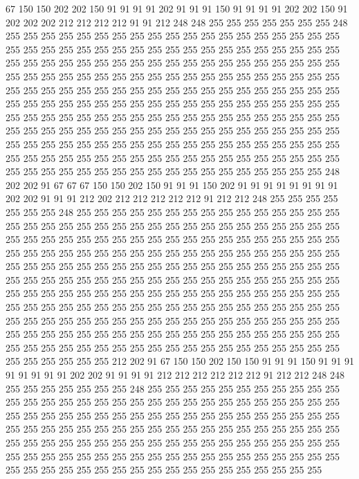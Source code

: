 67 150 150 202 202 150 91 91 91 91 202 91 91 91 150 91 91 91 91 202
202 150 91 202 202 202 212 212 212 212 91 91 212 248 248 255 255 255 255 255
255 255 248 255 255 255 255 255 255 255 255 255 255 255 255 255 255 255 255 255
255 255 255 255 255 255 255 255 255 255 255 255 255 255 255 255 255 255 255 255
255 255 255 255 255 255 255 255 255 255 255 255 255 255 255 255 255 255 255 255
255 255 255 255 255 255 255 255 255 255 255 255 255 255 255 255 255 255 255 255
255 255 255 255 255 255 255 255 255 255 255 255 255 255 255 255 255 255 255 255
255 255 255 255 255 255 255 255 255 255 255 255 255 255 255 255 255 255 255 255
255 255 255 255 255 255 255 255 255 255 255 255 255 255 255 255 255 255 255 255
255 255 255 255 255 255 255 255 255 255 255 255 255 255 255 255 255 255 255 255
255 255 255 255 255 255 255 255 255 255 255 255 255 255 255 255 255 255 255 255
255 255 255 255 255 255 255 255 255 255 255 255 255 255 255 255 255 255 255 255
255 255 255 255 255 255 255 255 255 255 255 248 202 202 91 67 67 67 150 150
202 150 91 91 91 150 202 91 91 91 91 91 91 91 91 202 202 91 91 91
212 202 212 212 212 212 212 91 212 212 248 255 255 255 255 255 255 255 248 255
255 255 255 255 255 255 255 255 255 255 255 255 255 255 255 255 255 255 255 255
255 255 255 255 255 255 255 255 255 255 255 255 255 255 255 255 255 255 255 255
255 255 255 255 255 255 255 255 255 255 255 255 255 255 255 255 255 255 255 255
255 255 255 255 255 255 255 255 255 255 255 255 255 255 255 255 255 255 255 255
255 255 255 255 255 255 255 255 255 255 255 255 255 255 255 255 255 255 255 255
255 255 255 255 255 255 255 255 255 255 255 255 255 255 255 255 255 255 255 255
255 255 255 255 255 255 255 255 255 255 255 255 255 255 255 255 255 255 255 255
255 255 255 255 255 255 255 255 255 255 255 255 255 255 255 255 255 255 255 255
255 255 255 255 255 255 255 255 255 255 255 255 255 255 255 255 255 255 255 255
255 255 255 255 255 255 255 255 255 255 255 255 255 255 255 255 255 255 255 255
255 255 255 255 255 255 255 255 255 255 212 202 91 67 150 150 202 150 150 91
91 91 150 91 91 91 91 91 91 91 91 202 202 91 91 91 91 212 212 212
212 212 212 91 212 212 248 248 255 255 255 255 255 255 255 248 255 255 255 255
255 255 255 255 255 255 255 255 255 255 255 255 255 255 255 255 255 255 255 255
255 255 255 255 255 255 255 255 255 255 255 255 255 255 255 255 255 255 255 255
255 255 255 255 255 255 255 255 255 255 255 255 255 255 255 255 255 255 255 255
255 255 255 255 255 255 255 255 255 255 255 255 255 255 255 255 255 255 255 255
255 255 255 255 255 255 255 255 255 255 255 255 255 255 255 255 255 255 255 255
255 255 255 255 255 255 255 255 255 255 255 255 255 255 255 255 255 255 255 255
